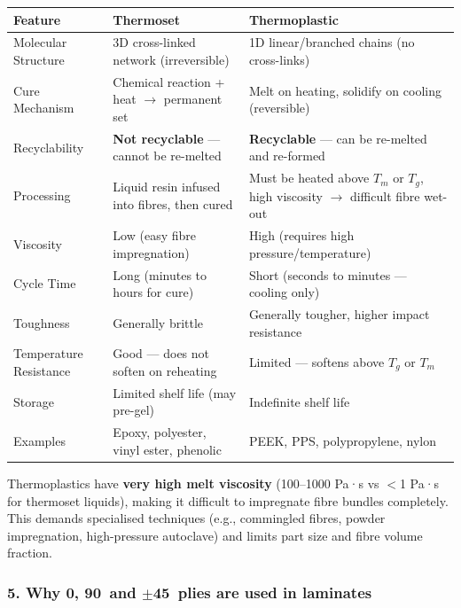 \documentclass{NoteThesis/note-thesis}
\begin{document}
\begin{table}[h]
    \centering
    \begin{tabular}{p{4.5cm}p{5cm}p{5cm}}
        \hline
        Feature & \textbf{Thermoset} & \textbf{Thermoplastic} \\
        \hline
        Molecular Structure & 3D cross-linked network (irreversible) & 1D linear/branched chains (no cross-links) \\
        Cure Mechanism & Chemical reaction + heat $\to$ permanent set & Melt on heating, solidify on cooling (reversible) \\
        Recyclability & \textbf{Not recyclable} — cannot be re-melted & \textbf{Recyclable} — can be re-melted and re-formed \\
        Processing & Liquid resin infused into fibres, then cured & Must be heated above $T_m$ or $T_g$, high viscosity $\to$ difficult fibre wet-out \\
        Viscosity & Low (easy fibre impregnation) & High (requires high pressure/temperature) \\
        Cycle Time & Long (minutes to hours for cure) & Short (seconds to minutes — cooling only) \\
        Toughness & Generally brittle & Generally tougher, higher impact resistance \\
        Temperature Resistance & Good — does not soften on reheating & Limited — softens above $T_g$ or $T_m$ \\
        Storage & Limited shelf life (may pre-gel) & Indefinite shelf life \\
        Examples & Epoxy, polyester, vinyl ester, phenolic & PEEK, PPS, polypropylene, nylon \\
        \hline
    \end{tabular}
\end{table}

Thermoplastics have \textbf{very high melt viscosity} (100--1000 Pa·s vs $<$1 Pa·s for thermoset liquids), making it difficult to impregnate fibre bundles completely. This demands specialised techniques (e.g., commingled fibres, powder impregnation, high-pressure autoclave) and limits part size and fibre volume fraction.

\subsubsection*{5. Why 0\textdegree, 90\textdegree\ and $\pm$45\textdegree\ plies are used in laminates}
\end{document}
